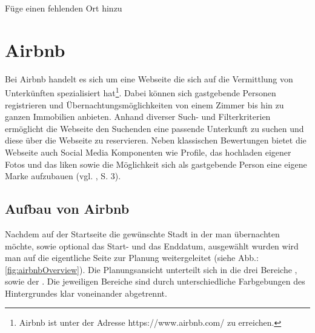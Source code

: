 \documentclass[../Bachelorarbeit.tex]{subfiles}
\begin{document}
Füge einen fehlenden Ort hinzu

\section{Airbnb}
\label{Airbnb}
Bei Airbnb handelt es sich um eine Webseite die sich auf die Vermittlung von Unterkünften spezialisiert hat\footnote{
	Airbnb ist unter der Adresse https://www.airbnb.com/ zu erreichen.
	}. 
Dabei können sich gastgebende Personen registrieren und Übernachtungsmöglichkeiten von einem Zimmer bis hin zu ganzen Immobilien anbieten. 
Anhand diverser Such- und Filterkriterien ermöglicht die Webseite den Suchenden eine passende Unterkunft zu suchen und diese über die Webseite zu reservieren.
Neben klassischen Bewertungen bietet die Webseite auch Social Media Komponenten wie Profile, das hochladen eigener Fotos und das liken  sowie die Möglichkeit sich als gastgebende Person eine eigene Marke aufzubauen (vgl. \cite{Yannopoulou2013}, S. 3).

\subsection{Aufbau von Airbnb}
Nachdem auf der Startseite die gewünschte Stadt in der man übernachten möchte, sowie optional das Start- und das Enddatum, ausgewählt wurden wird man auf die eigentliche Seite zur Planung weitergeleitet (siehe Abb.: \ref{fig:airbnbOverview}).
Die Planungsansicht unterteilt sich in die drei Bereiche ,  sowie der .
Die jeweiligen Bereiche sind durch unterschiedliche Farbgebungen des Hintergrundes klar voneinander abgetrennt.
\end{document}
